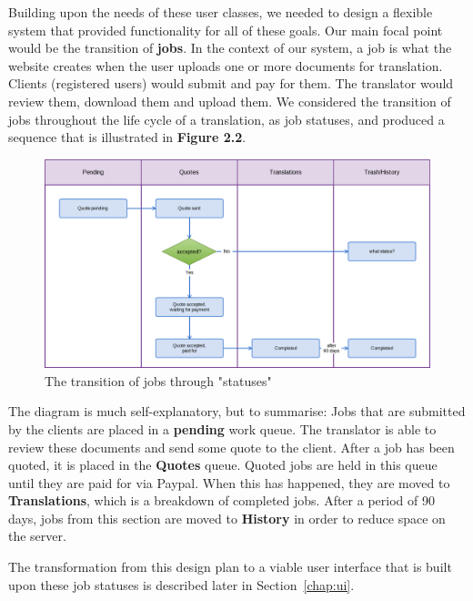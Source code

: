 \documentclass{l3proj}
\begin{document}
Building upon the needs of these user classes, we needed to design a flexible system that provided functionality for all of these goals. Our main focal point would be the transition of \textbf{jobs}. In the context of our system, a job is what the website creates when the user uploads one or more documents for translation. Clients (registered users) would submit and pay for them. The translator would review them, download them and upload them. We considered the transition of jobs throughout the life cycle of a translation, as job statuses, and produced a sequence that is illustrated in \textbf{Figure 2.2}. 

\begin{figure}
\begin{center}
\includegraphics[width=\linewidth]{jobstatuses}
\caption{The transition of jobs through "statuses"}
\end{center}
\end{figure}

The diagram is much self-explanatory, but to summarise: Jobs that are submitted by the clients are placed in a \textbf{pending} work queue. The translator is able to review these documents and send some quote to the client. After a job has been quoted, it is placed in the \textbf{Quotes} queue. Quoted jobs are held in this queue until they are paid for via Paypal. When this has happened, they are moved to \textbf{Translations}, which is a breakdown of completed jobs. After a period of 90 days, jobs from this section are moved to \textbf{History} in order to reduce space on the server.

The transformation from this design plan to a viable user interface that is built upon these job statuses is described later in Section~\ref{chap:ui}.
\end{document}
